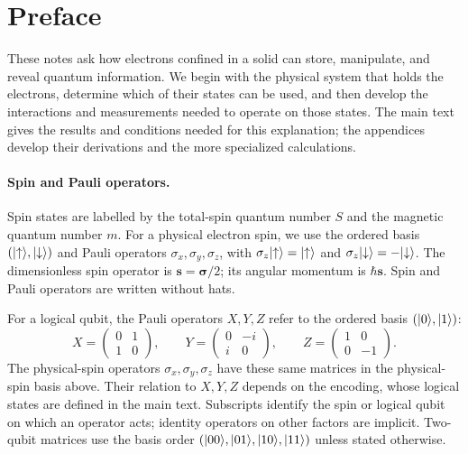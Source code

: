 \section*{Preface}
{}
\label{sec:preface}

These notes ask how electrons confined in a solid can store, manipulate,
and reveal quantum information. We begin with the physical system that
holds the electrons, determine which of their states can be used, and
then develop the interactions and measurements needed to operate on
those states. The main text gives the results and conditions needed for
this explanation; the appendices develop their derivations and the
more specialized calculations.

\begingroup
\renewcommand{\theequation}{Pref.\arabic{equation}}

\paragraph{Spin and Pauli operators.}
Spin states are labelled by the total-spin quantum number $S$ and
the magnetic quantum number $m$. For a physical electron spin, we
use the ordered basis $(\lvert \uparrow\rangle,\lvert \downarrow\rangle)$ and
Pauli operators $\sigma_x,\sigma_y,\sigma_z$, with
$\sigma_z\lvert \uparrow\rangle=\lvert \uparrow\rangle$ and
$\sigma_z\lvert \downarrow\rangle=-\lvert \downarrow\rangle$.
The dimensionless spin operator is
$\mathbf s=\boldsymbol\sigma/2$; its angular momentum is
$\hbar\mathbf s$. Spin and Pauli operators are written without hats.

For a logical qubit, the Pauli operators $X,Y,Z$ refer to the ordered
basis $(\lvert 0\rangle,\lvert 1\rangle)$:
\begin{equation}
 X=\begin{pmatrix}0&1\\1&0\end{pmatrix},\qquad
 Y=\begin{pmatrix}0&-i\\i&0\end{pmatrix},\qquad
 Z=\begin{pmatrix}1&0\\0&-1\end{pmatrix}.
 \label{eq:elementary-logical-gate-matrices}
\end{equation}
The physical-spin operators $\sigma_x,\sigma_y,\sigma_z$ have these
same matrices in the physical-spin basis above. Their relation to
$X,Y,Z$ depends on the encoding, whose logical states are defined
in the main text. Subscripts identify the spin or logical qubit
on which an operator acts; identity operators on other factors
are implicit. Two-qubit matrices use the basis order
$(\lvert 00\rangle,\lvert 01\rangle,\lvert 10\rangle,\lvert 11\rangle)$ unless stated otherwise.

